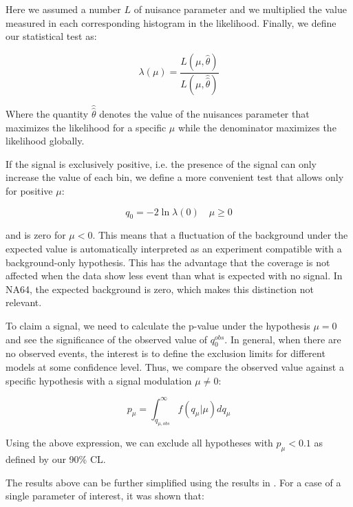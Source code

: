 Here we assumed a number $L$ of nuisance parameter and we multiplied the value measured in each corresponding histogram in the likelihood. Finally, we define our statistical test as:

\begin{equation}
  \label{eq:profile-likelihood}
  \lambda(\mu) = \frac{L(\mu,\hat{\theta})}{L(\mu,\hat{\hat{\theta}})}
\end{equation}

Where the quantity $\hat{\hat{\theta}}$ denotes the value of the nuisances parameter that maximizes the likelihood for a specific $\mu$ while the denominator maximizes the likelihood globally.

If the signal is exclusively positive, i.e. the presence of the signal can only increase the value of each bin, we define a more convenient test that allows only for positive $\mu$:

\begin{equation}
  \label{eq:profile-q}
  q_0 = -2\ln{\lambda(0)} \quad \mu \geq 0
\end{equation}

and is zero for $\mu < 0$. This means that a fluctuation of the background under the expected value is automatically interpreted as an experiment compatible with a background-only hypothesis. This has the advantage that the coverage is not affected when the data show less event than what is expected with no signal. In NA64, the expected background is zero, which makes this distinction not relevant.

To claim a signal, we need to calculate the p-value under the hypothesis $\mu = 0$ and see the significance of the observed value of $q^{obs}_0$. In general, when there are no observed events, the interest is to define the exclusion limits for different models at some confidence level. Thus, we compare the observed value against a specific hypothesis with a signal modulation $\mu \neq 0$:

\begin{equation}
  \label{eq:p-value-q}
  p_{\mu} = \int_{q_{\mu, obs}}^{\infty} f(q_{\mu}|\mu) dq_{\mu}
\end{equation}

Using the above expression, we can exclude all hypotheses with $p_{\mu} < 0.1$ as defined by our 90\% CL.

The results above can be further simplified using the results in \cite{10.2307/1990256}. For a case of a single parameter of interest, it was shown that:

